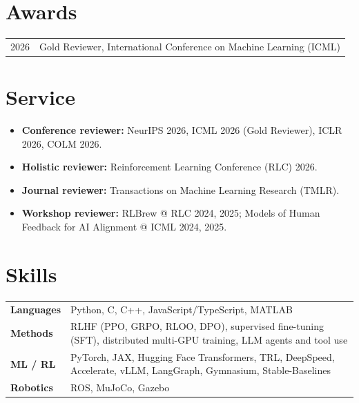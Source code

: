 \documentclass[10pt]{article}
\newcommand{\hl}[1]{{\color{accent}#1}}
\begin{document}
\section{Awards}
\begin{tabularx}{\linewidth}{@{}l X@{}}
  2026 & Gold Reviewer, International Conference on Machine Learning (ICML) \\
\end{tabularx}

\section{Service}
\begin{itemize}
  \item \textbf{Conference reviewer:} NeurIPS 2026, ICML 2026 (\hl{Gold Reviewer}), ICLR 2026, COLM 2026.
  \item \textbf{Holistic reviewer:} Reinforcement Learning Conference (RLC) 2026.
  \item \textbf{Journal reviewer:} Transactions on Machine Learning Research (TMLR).
  \item \textbf{Workshop reviewer:} RLBrew @ RLC 2024, 2025; Models of Human Feedback for AI Alignment @ ICML 2024, 2025.
\end{itemize}

\section{Skills}
\begin{tabularx}{\linewidth}{@{}l X@{}}
  \textbf{Languages} & Python, C, C++, JavaScript/TypeScript, MATLAB \\
  \textbf{Methods}   & RLHF (PPO, GRPO, RLOO, DPO), supervised fine-tuning (SFT), distributed multi-GPU training, LLM agents and tool use \\
  \textbf{ML / RL}   & PyTorch, JAX, Hugging Face Transformers, TRL, DeepSpeed, Accelerate, vLLM, LangGraph, Gymnasium, Stable-Baselines \\
  \textbf{Robotics}  & ROS, MuJoCo, Gazebo \\
\end{tabularx}
\end{document}
